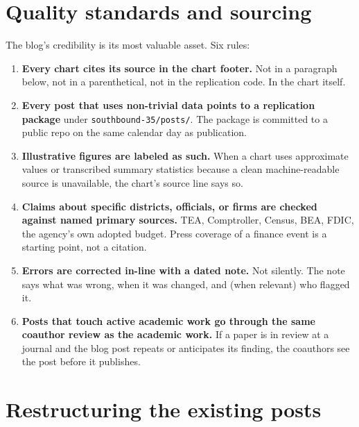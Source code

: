 \documentclass[11pt]{article}
\begin{document}
\section{Quality standards and sourcing}

The blog's credibility is its most valuable asset. Six rules:

\begin{enumerate}
\item \textbf{Every chart cites its source in the chart footer.}
Not in a paragraph below, not in a parenthetical, not in the
replication code. In the chart itself.

\item \textbf{Every post that uses non-trivial data points to a
replication package} under \texttt{southbound-35/posts/}. The
package is committed to a public repo on the same calendar day as
publication.

\item \textbf{Illustrative figures are labeled as such.} When a
chart uses approximate values or transcribed summary statistics
because a clean machine-readable source is unavailable, the
chart's source line says so.

\item \textbf{Claims about specific districts, officials, or
firms are checked against named primary sources.} TEA, Comptroller,
Census, BEA, FDIC, the agency's own adopted budget. Press
coverage of a finance event is a starting point, not a citation.

\item \textbf{Errors are corrected in-line with a dated note.}
Not silently. The note says what was wrong, when it was changed,
and (when relevant) who flagged it.

\item \textbf{Posts that touch active academic work go through the
same coauthor review as the academic work.} If a paper is in
review at a journal and the blog post repeats or anticipates its
finding, the coauthors see the post before it publishes.
\end{enumerate}

\section{Restructuring the existing posts}
\end{document}
